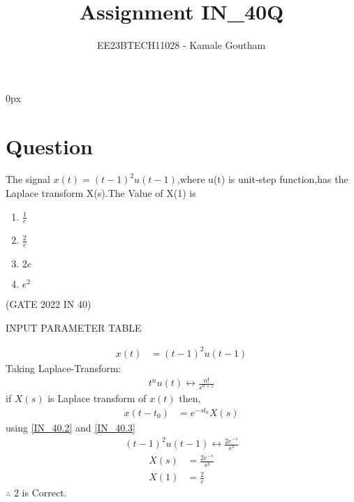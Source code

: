 \documentclass[journal,12pt,twocolumn]{IEEEtran}
\theoremstyle{remark}
\begin{document}
\parindent 0px

\title{Assignment IN\_40Q}
\author{EE23BTECH11028 - Kamale Goutham$^{}$%
}
\maketitle
\newpage
\bigskip
\section*{Question}
The signal $x(t)=(t-1)^2u(t-1)$,where u(t) is unit-step function,has the Laplace transform X(s).The Value of X(1) is 
\begin{enumerate}
    \item $\frac{1}{e}$
    \item $\frac{2}{e}$
    \item $2e$
    \item $e^2$
\end{enumerate}
\hfill{(GATE 2022 IN 40)}\\
\solution
\fi
\begin{table}[ht]
    \centering
    \def\arraystretch{1.5}
    
    \caption{INPUT PARAMETER TABLE}
    \label{tab:11.9.5.6}
\end{table}
\begin{align}
    x(t)&=(t-1)^2u(t-1) 
\end{align}
  Taking Laplace-Transform:\\
\begin{align}
    t^nu(t) \leftrightarrow \frac{n!}{s^{n+1}} \label{IN_40.2}
\end{align}
if $X(s)$ is Laplace transform of $x(t)$ then,\\
\begin{align}
  x(t-t_0)&=e^{-st_0}X(s)\label{IN_40.3}
\end{align}
using \ref{IN_40.2} and \ref{IN_40.3}\\
\begin{align}
    (t-1)^2u(t-1) \leftrightarrow \frac{2e^{-s}}{s^3}
\end{align}
\begin{align}
    X(s)&=\frac{2e^{-s}}{s^3}\\
    X(1)&=\frac{2}{e}
\end{align}
$\therefore$ 2 is Correct.
\end{document}
